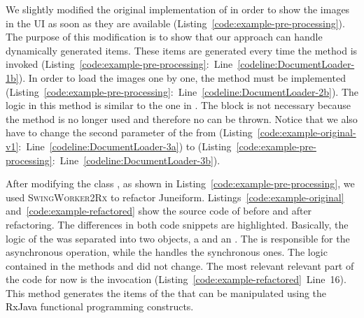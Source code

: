 \documentclass[type=bsc,accentcolor=tud9c]{tudthesis}
\newcommand{\framework}[1]{\textcolor{black}{#1}}
\newcommand{\toolextension}{\textsc{SwingWorker2Rx}}
\begin{document}


We slightly modified the original implementation of  in order to show the images in the UI as soon as they are available (Listing~\ref{code:example-pre-processing}). The purpose of this modification is to show that our approach can handle dynamically generated items. These items are generated every time the method  is invoked (Listing~\ref{code:example-pre-processing}:~Line~\ref{codeline:DocumentLoader-1b}). In order to load the images one by one, the method  must be implemented (Listing~\ref{code:example-pre-processing}:~Line~\ref{codeline:DocumentLoader-2b}). The logic in this method is similar to the one in . The  block is not necessary because the method  is no longer used and therefore no  can be thrown. Notice that we also have to change the second parameter of the  from  (Listing~\ref{code:example-original-v1}:~Line~\ref{codeline:DocumentLoader-3a}) to  (Listing~\ref{code:example-pre-processing}:~Line~\ref{codeline:DocumentLoader-3b}).



After modifying the class , as shown in Listing~\ref{code:example-pre-processing}, we used \toolextension{} to refactor Juneiform. Listings~\ref{code:example-original} and~\ref{code:example-refactored} show the source code of  before and after refactoring. The differences in both code snippets are highlighted. Basically, the logic of the  was separated into two objects, a  and an . The  is responsible for the asynchronous operation, while the  handles the synchronous ones. The logic contained in the methods  and  did not change. The most relevant relevant part of the code for now is the  invocation (Listing~\ref{code:example-refactored}~Line~16). This method generates the items of the  that can be manipulated using the \framework{RxJava} functional programming constructs.
\end{document}
